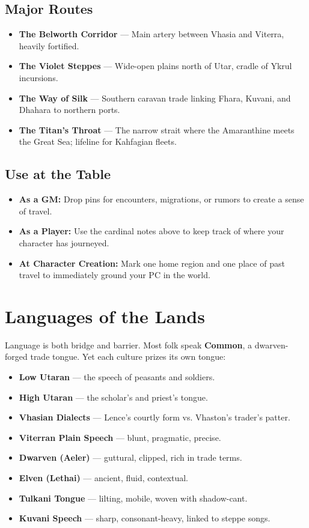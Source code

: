 \documentclass[11pt]{article}
\begin{document}
\subsection*{Major Routes}
\begin{itemize}
  \item \textbf{The Belworth Corridor} — Main artery between Vhasia and Viterra, heavily fortified.  
  \item \textbf{The Violet Steppes} — Wide-open plains north of Utar, cradle of Ykrul incursions.  
  \item \textbf{The Way of Silk} — Southern caravan trade linking Fhara, Kuvani, and Dhahara to northern ports.  
  \item \textbf{The Titan’s Throat} — The narrow strait where the Amaranthine meets the Great Sea; lifeline for Kahfagian fleets.  
\end{itemize}

\subsection*{Use at the Table}
\begin{itemize}
  \item \textbf{As a GM:} Drop pins for encounters, migrations, or rumors to create a sense of travel.  
  \item \textbf{As a Player:} Use the cardinal notes above to keep track of where your character has journeyed.  
  \item \textbf{At Character Creation:} Mark one home region and one place of past travel to immediately ground your PC in the world.  
\end{itemize}


\section{Languages of the Lands}
Language is both bridge and barrier. Most folk speak \textbf{Common}, a dwarven-forged trade tongue. 
Yet each culture prizes its own tongue:
\begin{itemize}
  \item \textbf{Low Utaran} — the speech of peasants and soldiers.  
  \item \textbf{High Utaran} — the scholar’s and priest’s tongue.  
  \item \textbf{Vhasian Dialects} — Lence’s courtly form vs. Vhaston’s trader’s patter.  
  \item \textbf{Viterran Plain Speech} — blunt, pragmatic, precise.  
  \item \textbf{Dwarven (Aeler)} — guttural, clipped, rich in trade terms.  
  \item \textbf{Elven (Lethai)} — ancient, fluid, contextual.  
  \item \textbf{Tulkani Tongue} — lilting, mobile, woven with shadow-cant.  
  \item \textbf{Kuvani Speech} — sharp, consonant-heavy, linked to steppe songs.  
\end{itemize}
\end{document}
